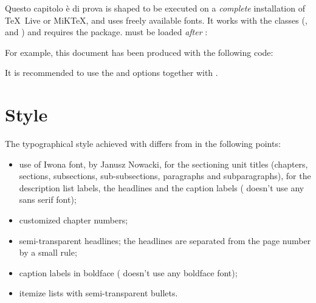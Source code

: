 Questo capitolo è di prova is shaped to be executed on a \emph{complete} installation of \TeX{}~Live or MiK\TeX, and uses freely available fonts.
It works with the  classes (,  and ) and requires the  package. \arsclassica{} must be loaded \emph{after} :

For example, this document has been produced with the following code:

It is recommended to use the  and  options together with \arsclassica.



\section{Style}

The typographical style achieved with \arsclassica{} differs from \classicthesis{} in the following points:
\begin{itemize}
\item use of Iwona font, by Janusz Nowacki, for the sectioning unit titles (chapters, sections, subsections, sub-subsections, paragraphs and subparagraphs), for the description list labels, the headlines and the caption labels (\classicthesis{} doesn't use any sans serif font);
\item customized chapter numbers;
\item semi-transparent headlines; the headlines are separated from the page number by a small rule;
\item caption labels in boldface (\classicthesis{} doesn't use any boldface font);
\item itemize lists with semi-transparent bullets.
\end{itemize}

